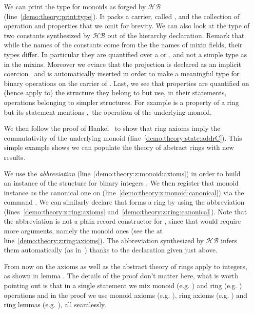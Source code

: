 \documentclass[a4paper,UKenglish,cleveref, autoref]{lipics-v2019}
\newcommand{\HB}{\ensuremath{\mathcal{HB}}}
\newcommand{\mixin}{mixin}
\newcommand{\mixins}{mixins}
\newcommand{\phantterm}{abbreviation}
\theoremstyle{implem}
\theoremstyle{implem}
\theoremstyle{command}
\begin{document}
We can print the type for monoids as forged by \HB{} (line~\ref{demo:theory:print:type}).
It packs a carrier, called , and the collection of operation and
properties that we omit for brevity.  We can also look at the type of two
constants synthesized by \HB{} out of the hierarchy declaration. Remark that
while the names of the constants come from the the names of \mixin{} fields,
their types differ.
In particular they are quantified over a  or ,
and not a simple type  as in the \mixins{}. Moreover we evince that
the  projection is declared as an implicit coercion~\cite{Saibi97}
and is automatically inserted in order to make  a meaningful
type for binary operations on the carrier of . Last, we see that
properties are quantified on (hence apply to) the structure they belong to but
use, in their statements, operations belonging to simpler structures.
For example  is a property of a ring but  its statement mentions ,\
the operation of the underlying monoid.

We then follow the proof of Hankel~\cite{nearrings} to show that
ring axioms imply the commutativity of the underlying monoid
(line~\ref{demo:theory:state:addrC}). This simple example shows we can
populate the theory of abstract rings with new results.

We use the  \emph{\phantterm{}}
(line~\ref{demo:theory:z:monoid:axioms})
in order to build an instance of the 
structure for binary integers .
We then register that monoid instance as the canonical one on 
(line~\ref{demo:theory:z:monoid:canonical}) via the command
.
We can similarly declare that  forms a ring by using
the  \phantterm{}
(lines~\ref{demo:theory:z:ring:axioms} and~\ref{demo:theory:z:ring:canonical}).
Note that the \coq{Ring_of_Monoid.Axioms} \phantterm{} is not
a plain record constructor for , since that
would require more arguments, namely the monoid ones (see the \coq{_}
at line~\ref{demo:theory:z:ring:axioms}). The
\phantterm{} synthesized by \HB{} infers them automatically
(as in~\cite[Section 7]{DBLP:conf/itp/MahboubiT13}) thanks to the 
declaration given just above.

From now on the axioms as well as the abstract theory of rings apply to
integers, as shown in lemma \coq{exercise}. The details of the proof
don't matter here, what is worth pointing out is that in a single
statement we mix monoid (e.g. \coq{+}) and ring (e.g. \coq{-}) operations and in the
proof we use monoid axioms (e.g. \coq{addrA}), ring axioms
(e.g. ) and ring lemmas (e.g. ), all seamlessly.
\end{document}
